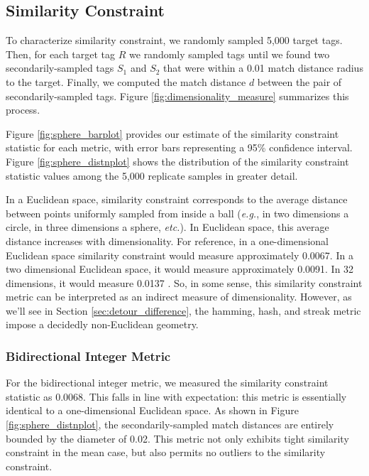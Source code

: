 \subsection{Similarity Constraint} \label{sec:similarityconstraint}



To characterize similarity constraint, we randomly sampled 5,000 target tags.
Then, for each target tag $R$ we randomly sampled tags until we found two secondarily-sampled tags $S_1$ and $S_2$ that were within a 0.01 match distance radius to the target.
Finally, we computed the match distance $d$ between the pair of secondarily-sampled tags.
Figure \ref{fig:dimensionality_measure} summarizes this process.

Figure \ref{fig:sphere_barplot} provides our estimate of the similarity constraint statistic for each metric, with error bars representing a 95\% confidence interval.
Figure \ref{fig:sphere_distnplot} shows the distribution of the similarity constraint statistic values among the 5,000 replicate samples in greater detail.

In a Euclidean space, similarity constraint corresponds to the average distance between points uniformly sampled from inside a ball (\textit{e.g.}, in two dimensions a circle, in three dimensions a sphere, \textit{etc.}).
In Euclidean space, this average distance increases with dimensionality.
For reference, in a one-dimensional Euclidean space similarity constraint would measure approximately 0.0067.
In a two dimensional Euclidean space, it would measure approximately  0.0091.
In 32 dimensions, it would measure 0.0137 \citep{dunbar1997average}.
So, in some sense, this similarity constraint metric can be interpreted as an indirect measure of dimensionality.
However, as we'll see in Section \ref{sec:detour_difference}, the hamming, hash, and streak metric impose a decidedly non-Euclidean geometry.

\subsubsection{Bidirectional Integer Metric}

For the bidirectional integer metric, we measured the similarity constraint statistic as 0.0068.
This falls in line with expectation: this metric is essentially identical to a one-dimensional Euclidean space.
As shown in Figure \ref{fig:sphere_distnplot}, the secondarily-sampled match distances are entirely bounded by the diameter of 0.02.
This metric not only exhibits tight similarity constraint in the mean case, but also permits no outliers to the similarity constraint.

